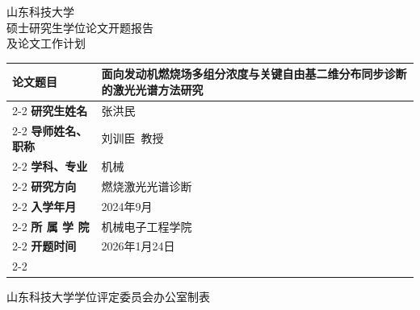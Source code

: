 \documentclass[a4paper,12pt]{ctexart}
\begin{document}
\thispagestyle{empty}
\begin{center}
  \vspace*{0.4cm}
  {\heiti 山东科技大学}\\[10pt]
  {\heiti 硕士研究生学位论文开题报告}\\[6pt]
  {\heiti 及论文工作计划}
\end{center}

\vspace{1.0cm}

\begin{tabular}{@{}p{3.6cm}p{10.4cm}@{}}
  \textbf{论文题目} & 面向发动机燃烧场多组分浓度与关键自由基二维分布同步诊断的激光光谱方法研究 \\
  \cline{2-2}
  \textbf{研究生姓名} & 张洪民 \\
  \cline{2-2}
  \textbf{导师姓名、职称} & 刘训臣~教授 \\
  \cline{2-2}
  \textbf{学科、专业} & 机械 \\
  \cline{2-2}
  \textbf{研究方向} & 燃烧激光光谱诊断 \\
  \cline{2-2}
  \textbf{入学年月} & 2024年9月 \\
  \cline{2-2}
  \textbf{所 属 学 院} & 机械电子工程学院 \\
  \cline{2-2}
  \textbf{开题时间} & 2026年1月24日 \\
  \cline{2-2}
\end{tabular}

\vspace{1.2cm}

\begin{center}
  {\heiti 山东科技大学学位评定委员会办公室制表}
\end{center}

\newpage
\end{document}
